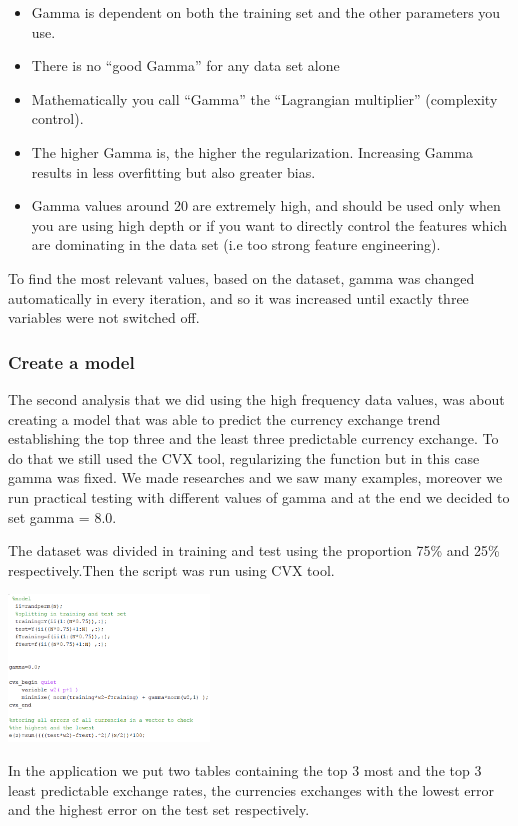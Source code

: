\begin{itemize}
\item Gamma is dependent on both the training set and the other parameters you use.
\item There is no “good Gamma” for any data set alone
\item Mathematically you call “Gamma” the “Lagrangian multiplier” (complexity control).
\item The higher Gamma is, the higher the regularization. Increasing Gamma results in less overfitting but also greater bias.
\item Gamma values around 20 are extremely high, and should be used only when you are using high depth or if you want to directly control the features which are dominating in the data set (i.e too strong feature engineering). 

\end{itemize}

To find the most relevant values, based on the dataset, gamma was changed automatically in every iteration, and so it was increased until exactly three variables were not switched off.

\subsubsection{Create a model}
The second analysis that we did using the high frequency data values, was about creating a model that was able to predict the currency exchange trend establishing the top three and the least three predictable currency exchange. To do that we still used the CVX tool, regularizing the function but in this case gamma was fixed. We made researches and we saw many examples, moreover we run practical testing with different values of gamma and at the end we decided to set gamma = 8.0.

The dataset was divided in training and test using the proportion 75\% and 25\% respectively.Then the script was run using CVX tool. 


\includegraphics[width=0.4\textwidth]{error.png}

In the application we put two tables containing the top 3 most and the top 3 least predictable exchange rates, the currencies exchanges with the lowest error and the highest error on the test set respectively.


